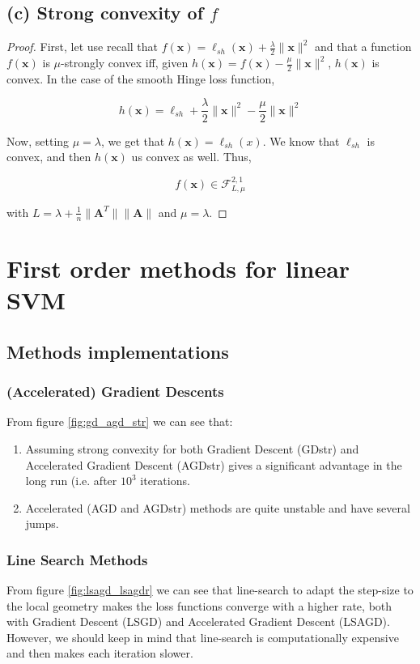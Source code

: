 \documentclass[12pt]{article}
\newcommand{\xb}{\mathbf{x}}
\newcommand{\xnorm}{\lVert \mathbf{\xb} \rVert}
\newcommand{\ellsh}{\ell_{sh}}
\newcommand{\fracn}{\frac{1}{n}}
\begin{document}
\subsection*{(c) Strong convexity of $f$}
\begin{proof}
First, let use recall that $f(\xb) = \ellsh(\xb) + \frac{\lambda}{2} \xnorm^2$ and that a function $f(\xb)$ is $\mu$-strongly convex iff, given $h(\xb) = f(\xb) - \frac{\mu}{2} \xnorm^2$, $h(\xb)$ is convex. In the case of the smooth Hinge loss function,

\begin{equation}
    h(\xb) = \ellsh + \frac{\lambda}{2} \xnorm^2 - \frac{\mu}{2} \xnorm^2
\end{equation}

Now, setting $\mu = \lambda$, we get that $h(\xb) = \ellsh(x)$. We know that $\ellsh$ is convex, and then $h(\xb)$ us convex as well. Thus,

\begin{equation}
    f(\xb) \in \mathcal{F}_{L, \mu}^{2, 1}
\end{equation}

with $L = \lambda + \fracn \lVert \mathbf{A}^T \rVert \lVert \mathbf{A} \rVert$ and $\mu = \lambda$.

\end{proof}

\section{First order methods for linear SVM}
\subsection*{Methods implementations}
\subsubsection*{(Accelerated) Gradient Descents}
From figure \ref{fig:gd_agd_str} we can see that:
\begin{enumerate}
    \item Assuming strong convexity for both Gradient Descent (GDstr) and Accelerated Gradient Descent (AGDstr) gives a significant advantage in the long run (i.e. after $10^3$ iterations.
    \item Accelerated (AGD and AGDstr) methods are quite unstable and have several jumps.
\end{enumerate}

\subsubsection*{Line Search Methods}
From figure \ref{fig:lsagd_lsagdr} we can see that line-search to adapt the step-size to the local geometry makes the loss functions converge with a higher rate, both with Gradient Descent (LSGD) and Accelerated Gradient Descent (LSAGD). However, we should keep in mind that line-search is computationally expensive and then makes each iteration slower.
\end{document}

